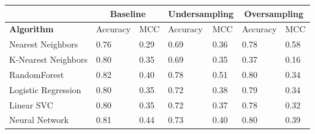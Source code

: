 \begin{tabular}{l|ll|ll|ll}
& \multicolumn{2}{c|}{\textbf{Baseline}} & \multicolumn{2}{c|}{\textbf{Undersampling}}  & \multicolumn{2}{c}{\textbf{Oversampling}} \\
\toprule
\textbf{Algorithm}      & Accuracy  & MCC   & Accuracy  & MCC   & Accuracy  & MCC   \\
\midrule                       
Nearest Neighbors       & 0.76      & 0.29  & 0.69      & 0.36  & 0.78      & 0.58  \\
K-Nearest Neighbors     & 0.80      & 0.35  & 0.69      & 0.35  & 0.37      & 0.16  \\
RandomForest            & 0.82      & 0.40  & 0.78      & 0.51  & 0.80      & 0.34  \\
Logistic Regression     & 0.80      & 0.35  & 0.72      & 0.38  & 0.79      & 0.34  \\
Linear SVC              & 0.80      & 0.35  & 0.72      & 0.37  & 0.78      & 0.32  \\
Neural Network          & 0.81      & 0.44  & 0.73      & 0.40  & 0.80      & 0.39  \\
\bottomrule
\end{tabular}